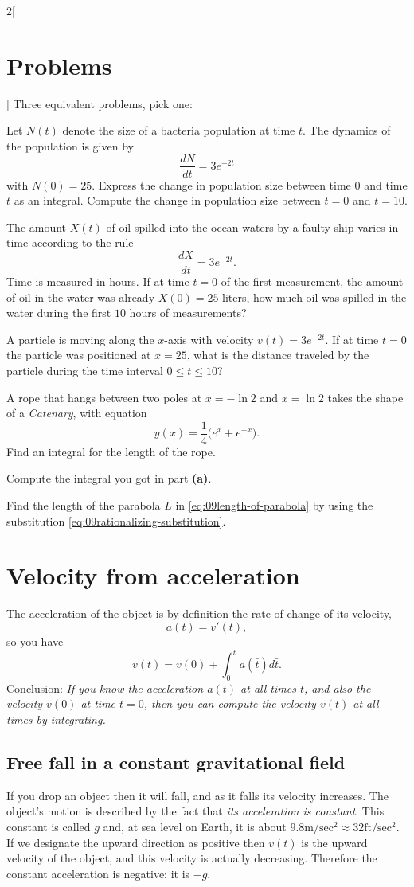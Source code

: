 \begin{multicols}{2}[
\section{Problems} %
\problemfont %
]
\problem Three equivalent problems, pick one: %

\subprob  Let $N(t)$ denote the size of a bacteria population at time $t$.  The
dynamics of the population is given by
\[
  \frac{dN}{dt}=3e^{-2t}
\]
with $N(0)=25$. Express the change in population size between time $0$ and time
$t$ as an integral.  Compute the change in population size between $t=0$ and
$t=10$.

\subprob  The amount $X(t)$ of oil spilled into the ocean waters by a faulty
ship varies in time according to the rule
\[
  \frac{dX}{dt}=3e^{-2t}.
\]
Time is measured in hours. If at time $t=0$ of the first measurement, the amount
of oil in the water was already $X(0)=25$ liters, how much oil was spilled in the
water during the first $10$ hours of measurements?

\subprob  A particle is moving along the $x$-axis with velocity $v(t)=3e^{-2t}$.
If at time $t=0$ the particle was positioned at $x=25$, what is the distance
traveled by the particle during the time interval $0 \leq t \leq 10$?

\problem A rope that hangs between two poles at $x=-\ln 2$ and $x=\ln 2$ takes %
the shape of a \textit{Catenary}, with equation
\[
  y(x)=\frac{1}{4}\bigl(e^x+e^{-x}\bigr).
\]
\subprob Find an integral for the length of the rope.

\subprob Compute the integral you got in part \textbf{(a)}.

\problem \label{ex:09length-of-parabola} %
Find the length of the parabola $L$ in \eqref{eq:09length-of-parabola}
by using the substitution \eqref{eq:09rationalizing-substitution}.
\end{multicols}
\noproblemfont
\section{Velocity from acceleration} %
The acceleration of the object is by definition the rate of change of its
velocity,
\[
a(t) = v'(t),
\]
so you have
\[
v(t) = v(0) + \int_{0}^{t} a(\bar t)d\bar t .
\]
Conclusion: \textit{If you know the acceleration $a(t)$ at all times $t$, and
  also the velocity $v(0)$ at time $t=0$, then you can compute the velocity
  $v(t)$ at all times by integrating.}

\subsection{Free fall in a constant gravitational field} %
If you drop an object then it will fall, and as it falls its velocity increases.
The object's motion is described by the fact that \textit{its acceleration is
constant}.  This constant is called $g$ and, at sea level on Earth, it is about $9.8
\textrm{m}/\textrm{sec}^2 \approx 32\textrm{ft}/\textrm{sec}^2$.  If we
designate the upward direction as positive then $v(t)$ is the upward velocity of
the object, and this velocity is actually decreasing.  Therefore the constant
acceleration is negative: it is $-g$.

